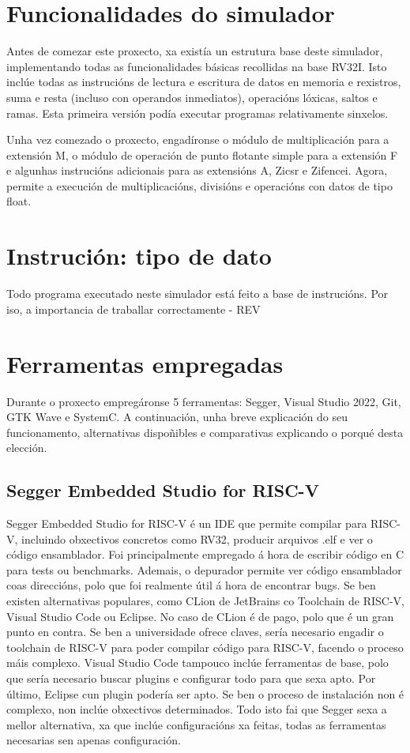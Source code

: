 \section{Funcionalidades do simulador}\label{sec:func_sim}
Antes de comezar este proxecto, xa existía un estrutura base deste simulador, implementando todas as funcionalidades básicas recollidas na base RV32I. Isto inclúe todas as instrucións de lectura e escritura de datos en memoria e rexistros, suma e resta (incluso con operandos inmediatos), operacións lóxicas, saltos e ramas. Esta primeira versión podía executar programas relativamente sinxelos.

Unha vez comezado o proxecto, engadíronse o módulo de multiplicación para a extensión M, o módulo de operación de punto flotante simple para a extensión F e algunhas instrucións adicionais para as extensións A, Zicsr e Zifencei. Agora, permite a execución de multiplicacións, divisións e operacións con datos de tipo float.

\section{Instrución: tipo de dato}\label{sec:inst}
Todo programa executado neste simulador está feito a base de instrucións. Por iso, a importancia de traballar correctamente - REV

\section{Ferramentas empregadas}\label{sec:ferramentas}
Durante o proxecto empregáronse 5 ferramentas: Segger, Visual Studio 2022, Git, GTK Wave e SystemC. A continuación, unha breve explicación do seu funcionamento, alternativas dispoñibles e comparativas explicando o porqué desta elección.

\subsection{Segger Embedded Studio for RISC-V}\label{sec:segger}
Segger Embedded Studio for RISC-V é un IDE que permite compilar para RISC-V, incluindo obxectivos concretos como RV32, producir arquivos .elf e ver o código ensamblador. Foi principalmente empregado á hora de escribir código en C para \gls{tests} ou \gls{benchmarks}. Ademais, o depurador permite ver código ensamblador coas direccións, polo que foi realmente útil á hora de encontrar bugs. Se ben existen alternativas populares, como CLion de JetBrains co Toolchain de RISC-V, Visual Studio Code ou Eclipse. No caso de CLion é de pago, polo que é un gran punto en contra. Se ben a universidade ofrece claves, sería necesario engadir o toolchain de RISC-V para poder compilar código para RISC-V, facendo o proceso máis complexo. Visual Studio Code tampouco inclúe ferramentas de base, polo que sería necesario buscar plugins e configurar todo para que sexa apto. Por último, Eclipse cun plugin podería ser apto. Se ben o proceso de instalación non é complexo, non inclúe obxectivos determinados. Todo isto fai que Segger sexa a mellor alternativa, xa que inclúe configuracións xa feitas, todas as ferramentas necesarias sen apenas configuración.

